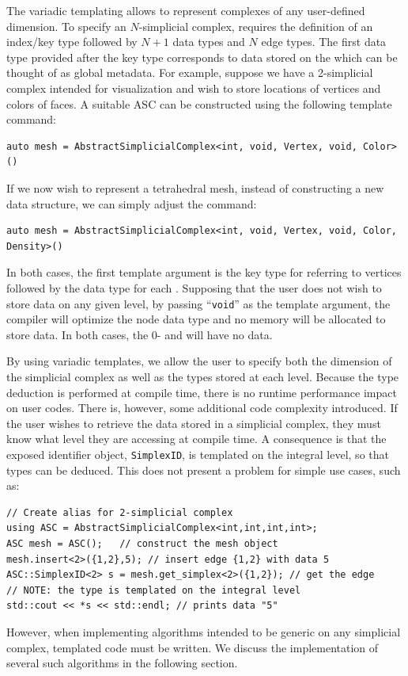 	\par The variadic templating allows \asc to represent complexes of any user-defined dimension.
	To specify an $N$-simplicial complex, \asc requires the definition of an index/key type followed by $N+1$ data types and $N$ edge types. The first data type provided after the key type corresponds to data stored on the \simplex{\varnothing} which can be thought of as global metadata.
	For example, suppose we have a 2-simplicial complex intended for visualization and wish to store locations of vertices and colors of faces.
	A suitable ASC can be constructed using the following template command:
\begin{lstlisting}
auto mesh = AbstractSimplicialComplex<int, void, Vertex, void, Color>()
\end{lstlisting}
	If we now wish to represent a tetrahedral mesh, instead of constructing a new data structure, we can simply adjust the command:
\begin{lstlisting}
auto mesh = AbstractSimplicialComplex<int, void, Vertex, void, Color, Density>()
\end{lstlisting}
	In both cases, the first template argument is the key type for referring to vertices followed by the data type for each . Supposing that the user does not wish to store data on any given level, by passing ``\texttt{void}'' as the template argument, the compiler will optimize the node data type and no memory will be allocated to store data. In both cases, the 0- and  will have no data.

	\par By using variadic templates, we allow the user to specify both the dimension of the simplicial complex as well as the types stored at each level. Because the type deduction is performed at compile time, there is no runtime performance impact on user codes. There is, however, some additional code complexity introduced. If the user wishes to retrieve the data stored in a simplicial complex, they must know what level they are accessing at compile time. A consequence is that the exposed identifier object, \verb|SimplexID|, is templated on the integral level, so that types can be deduced. This does not present a problem for simple use cases, such as:
\begin{lstlisting}[caption={Example instantiation of 2-simplicial complex using \asc.},captionpos=b]
// Create alias for 2-simplicial complex
using ASC = AbstractSimplicialComplex<int,int,int,int>;
ASC mesh = ASC();	// construct the mesh object
mesh.insert<2>({1,2},5); // insert edge {1,2} with data 5
ASC::SimplexID<2> s = mesh.get_simplex<2>({1,2}); // get the edge
// NOTE: the type is templated on the integral level
std::cout << *s << std::endl; // prints data "5"
\end{lstlisting}
	However, when implementing algorithms intended to be generic on any simplicial complex, templated code must be written. We discuss the implementation of several such algorithms in the following section.


